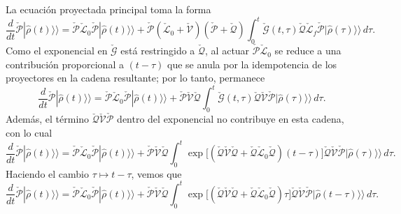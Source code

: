 \begin{appendixs}
La ecuación proyectada principal toma la forma
\begin{equation*}
    \frac{d}{dt}\check{\mathcal{P}}|\hat{\rho}(t)\rangle\rangle
    =\check{\mathcal{P}}\check{\mathcal{L}}_{0}\check{\mathcal{P}}|\hat{\rho}(t)\rangle\rangle
     +\check{\mathcal{P}}(\check{\mathcal{L}}_{0}+\check{\mathcal{V}})(\check{\mathcal{P}}+\check{\mathcal{Q}})
      \int_{0}^{t}\!\check{\mathcal{G}}(t,\tau)\check{\mathcal{Q}}\check{\mathcal{L}}_{f}\check{\mathcal{P}}
      |\hat{\rho}(\tau)\rangle\rangle\,d\tau .
\end{equation*}
Como el exponencial en $\check{\mathcal{G}}$ está restringido a $\check{\mathcal{Q}}$, al actuar
$\check{\mathcal{P}}\check{\mathcal{L}}_{0}$ se reduce a una contribución proporcional a $(t-\tau)$
que se anula por la idempotencia de los proyectores en la cadena resultante; por lo tanto,
permanece
\begin{equation*}
    \frac{d}{dt}\check{\mathcal{P}}|\hat{\rho}(t)\rangle\rangle
    =\check{\mathcal{P}}\check{\mathcal{L}}_{0}\check{\mathcal{P}}|\hat{\rho}(t)\rangle\rangle
     +\check{\mathcal{P}}\check{\mathcal{V}}\check{\mathcal{Q}}
      \int_{0}^{t}\!\check{\mathcal{G}}(t,\tau)\check{\mathcal{Q}}\check{\mathcal{V}}\check{\mathcal{P}}
      |\hat{\rho}(\tau)\rangle\rangle\,d\tau .
\end{equation*}
Además, el término $\check{\mathcal{Q}}\check{\mathcal{V}}\check{\mathcal{P}}$ dentro del
exponencial no contribuye en esta cadena, con lo cual
\begin{equation*}
    \frac{d}{dt}\check{\mathcal{P}}|\hat{\rho}(t)\rangle\rangle
    =\check{\mathcal{P}}\check{\mathcal{L}}_{0}\check{\mathcal{P}}|\hat{\rho}(t)\rangle\rangle
     +\check{\mathcal{P}}\check{\mathcal{V}}\check{\mathcal{Q}}
      \int_{0}^{t}\!\exp\!\Big[(\check{\mathcal{Q}}\check{\mathcal{V}}\check{\mathcal{Q}}
      +\check{\mathcal{Q}}\check{\mathcal{L}}_{0}\check{\mathcal{Q}})(t-\tau)\Big]
      \check{\mathcal{Q}}\check{\mathcal{V}}\check{\mathcal{P}}
      |\hat{\rho}(\tau)\rangle\rangle\,d\tau .
\end{equation*}
Haciendo el cambio $\tau\mapsto t-\tau$, vemos que 
\begin{equation*}
    \frac{d}{dt}\check{\mathcal{P}}|\hat{\rho}(t)\rangle\rangle
    =\check{\mathcal{P}}\check{\mathcal{L}}_{0}\check{\mathcal{P}}|\hat{\rho}(t)\rangle\rangle
     +\check{\mathcal{P}}\check{\mathcal{V}}\check{\mathcal{Q}}
      \int_{0}^{t}\!\exp\!\Big[(\check{\mathcal{Q}}\check{\mathcal{V}}\check{\mathcal{Q}}
      +\check{\mathcal{Q}}\check{\mathcal{L}}_{0}\check{\mathcal{Q}})\tau\Big]
      \check{\mathcal{Q}}\check{\mathcal{V}}\check{\mathcal{P}}
      |\hat{\rho}(t-\tau)\rangle\rangle\,d\tau .
\end{equation*}



\end{appendixs}
